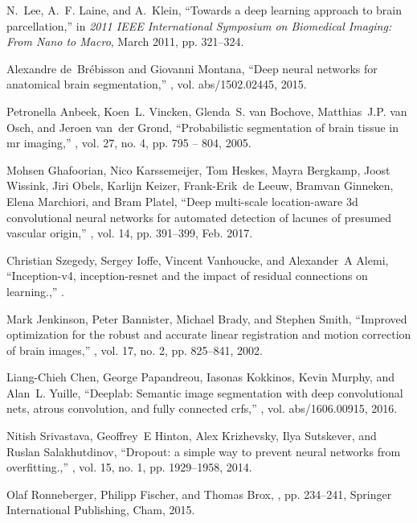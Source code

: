 \documentclass{article}
\begin{document}
\begin{thebibliography}{10}
N.~Lee, A.~F. Laine, and A.~Klein,
\newblock ``Towards a deep learning approach to brain parcellation,''
\newblock in {\em 2011 IEEE International Symposium on Biomedical Imaging: From
  Nano to Macro}, March 2011, pp. 321--324.

Alexandre de~Br{\'{e}}bisson and Giovanni Montana,
\newblock ``Deep neural networks for anatomical brain segmentation,''
, vol. abs/1502.02445, 2015.

Petronella Anbeek, Koen~L. Vincken, Glenda~S. van Bochove, Matthias~J.P. van
  Osch, and Jeroen van~der Grond,
\newblock ``Probabilistic segmentation of brain tissue in mr imaging,''
, vol. 27, no. 4, pp. 795 -- 804, 2005.

Mohsen Ghafoorian, Nico Karssemeijer, Tom Heskes, Mayra Bergkamp, Joost
  Wissink, Jiri Obels, Karlijn Keizer, Frank-Erik~de Leeuw, Bramvan Ginneken,
  Elena Marchiori, and Bram Platel,
\newblock ``Deep multi-scale location-aware 3d convolutional neural networks
  for automated detection of lacunes of presumed vascular origin,''
, vol. 14, pp. 391--399, Feb. 2017.

Christian Szegedy, Sergey Ioffe, Vincent Vanhoucke, and Alexander~A Alemi,
\newblock ``Inception-v4, inception-resnet and the impact of residual
  connections on learning.,''
.

Mark Jenkinson, Peter Bannister, Michael Brady, and Stephen Smith,
\newblock ``Improved optimization for the robust and accurate linear
  registration and motion correction of brain images,''
, vol. 17, no. 2, pp. 825--841, 2002.

Liang{-}Chieh Chen, George Papandreou, Iasonas Kokkinos, Kevin Murphy, and
  Alan~L. Yuille,
\newblock ``Deeplab: Semantic image segmentation with deep convolutional nets,
  atrous convolution, and fully connected crfs,''
, vol. abs/1606.00915, 2016.

Nitish Srivastava, Geoffrey~E Hinton, Alex Krizhevsky, Ilya Sutskever, and
  Ruslan Salakhutdinov,
\newblock ``Dropout: a simple way to prevent neural networks from
  overfitting.,''
, vol. 15, no. 1, pp.
  1929--1958, 2014.

Olaf Ronneberger, Philipp Fischer, and Thomas Brox,
, pp. 234--241,
\newblock Springer International Publishing, Cham, 2015.

\end{thebibliography}
\end{document}

